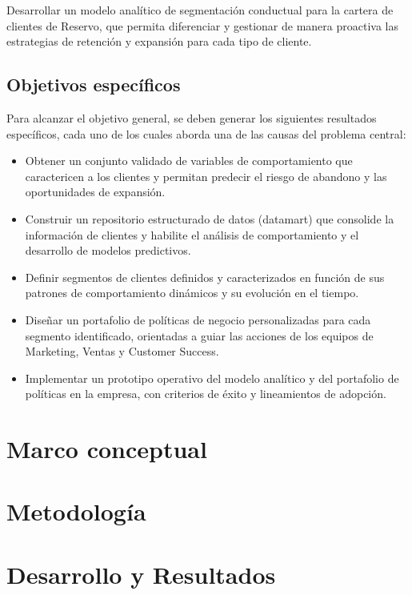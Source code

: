 Desarrollar un modelo analítico de segmentación conductual para la cartera de clientes de Reservo, que permita diferenciar y gestionar de manera proactiva las estrategias de retención y expansión para cada tipo de cliente.

\subsection{Objetivos específicos}

Para alcanzar el objetivo general, se deben generar los siguientes resultados específicos, cada uno de los cuales aborda una de las causas del problema central:

\begin{itemize}
    \item Obtener un conjunto validado de variables de comportamiento que caractericen a los clientes y permitan predecir el riesgo de abandono y las oportunidades de expansión.
    
    \item Construir un repositorio estructurado de datos (datamart) que consolide la información de clientes y habilite el análisis de comportamiento y el desarrollo de modelos predictivos.
    
    \item Definir segmentos de clientes definidos y caracterizados en función de sus patrones de comportamiento dinámicos y su evolución en el tiempo.
    
    \item Diseñar un portafolio de políticas de negocio personalizadas para cada segmento identificado, orientadas a guiar las acciones de los equipos de Marketing, Ventas y Customer Success.

    \item Implementar un prototipo operativo del modelo analítico y del portafolio de políticas en la empresa, con criterios de éxito y lineamientos de adopción.

\end{itemize}

\section{Marco conceptual}

\section{Metodología}

\section{Desarrollo y Resultados}

